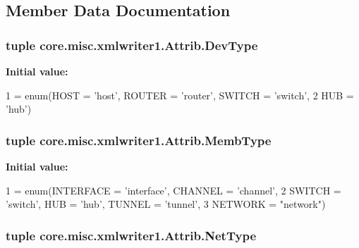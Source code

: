 \subsection{Member Data Documentation}
\hypertarget{classcore_1_1misc_1_1xmlwriter1_1_1_attrib_af62b4beecf187fd42434df9d51f36920}{
\subsubsection[{Dev\+Type}]{\setlength{\rightskip}{0pt plus 5cm}tuple core.\+misc.\+xmlwriter1.\+Attrib.\+Dev\+Type\hspace{0.3cm}{\ttfamily [static]}}}\label{classcore_1_1misc_1_1xmlwriter1_1_1_attrib_af62b4beecf187fd42434df9d51f36920}
{\bfseries Initial value\+:}
\begin{DoxyCode}
1 = enum(HOST = \textcolor{stringliteral}{'host'}, ROUTER = \textcolor{stringliteral}{'router'}, SWITCH = \textcolor{stringliteral}{'switch'},
2                    HUB = \textcolor{stringliteral}{'hub'})
\end{DoxyCode}
\hypertarget{classcore_1_1misc_1_1xmlwriter1_1_1_attrib_a2e5551433d9f8c7d4228113972d8d167}{
\subsubsection[{Memb\+Type}]{\setlength{\rightskip}{0pt plus 5cm}tuple core.\+misc.\+xmlwriter1.\+Attrib.\+Memb\+Type\hspace{0.3cm}{\ttfamily [static]}}}\label{classcore_1_1misc_1_1xmlwriter1_1_1_attrib_a2e5551433d9f8c7d4228113972d8d167}
{\bfseries Initial value\+:}
\begin{DoxyCode}
1 = enum(INTERFACE = \textcolor{stringliteral}{'interface'}, CHANNEL = \textcolor{stringliteral}{'channel'},
2                     SWITCH = \textcolor{stringliteral}{'switch'}, HUB = \textcolor{stringliteral}{'hub'}, TUNNEL = \textcolor{stringliteral}{'tunnel'},
3                     NETWORK = \textcolor{stringliteral}{"network"})
\end{DoxyCode}
\hypertarget{classcore_1_1misc_1_1xmlwriter1_1_1_attrib_afee91d12eeccd3afbf4fcf3c3b2bbe25}{
\subsubsection[{Net\+Type}]{\setlength{\rightskip}{0pt plus 5cm}tuple core.\+misc.\+xmlwriter1.\+Attrib.\+Net\+Type\hspace{0.3cm}{\ttfamily [static]}}}\label{classcore_1_1misc_1_1xmlwriter1_1_1_attrib_afee91d12eeccd3afbf4fcf3c3b2bbe25}
